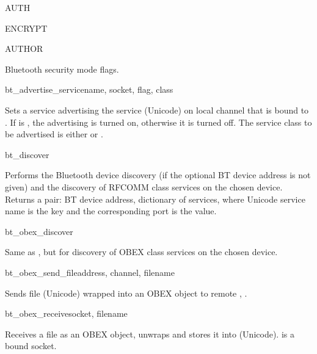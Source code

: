 \begin{datadesc}{AUTH}
\end{datadesc}
\begin{datadesc}{ENCRYPT}
\end{datadesc}
\begin{datadesc}{AUTHOR}

Bluetooth security mode flags.

\end{datadesc}

\begin{funcdesc}{bt_advertise_service}{name, socket, flag, class}

Sets a service advertising the service  (Unicode) on local channel 
that is bound to . If  is , the advertising is 
turned on, otherwise it is turned off. The service class to be advertised is 
either  or .

\end{funcdesc}

\begin{funcdesc}{bt_discover}{}

Performs the Bluetooth device discovery (if the optional BT device address 
is not given) and the discovery of RFCOMM class services on the chosen 
device. Returns a pair: BT device address, dictionary of services, where 
Unicode service name is the key and the corresponding port is the value.

\end{funcdesc}

\begin{funcdesc}{bt_obex_discover}{}

Same as , but for discovery of OBEX class services on the 
chosen device.

\end{funcdesc}

\begin{funcdesc}{bt_obex_send_file}{address, channel, filename}

Sends file  (Unicode) wrapped into an OBEX object 
to remote , .

\end{funcdesc}

\begin{funcdesc}{bt_obex_receive}{socket, filename}

Receives a file as an OBEX object, unwraps and stores it into  
(Unicode).  is a bound  socket.

\end{funcdesc}

